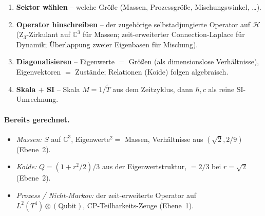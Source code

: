 \begin{keyresult}
\begin{enumerate}
  \item \textbf{Sektor wählen} -- welche Größe (Massen, Prozessgröße,
        Mischungswinkel, \dots).
  \item \textbf{Operator hinschreiben} -- der zugehörige selbstadjungierte
        Operator auf $\mathcal{H}$ (Z$_3$-Zirkulant auf $\mathbb{C}^3$ für
        Massen; zeit-erweiterter Connection-Laplace für Dynamik; Überlappung
        zweier Eigenbasen für Mischung).
  \item \textbf{Diagonalisieren} -- Eigenwerte $=$ Größen (als dimensionslose
        Verhältnisse), Eigenvektoren $=$ Zustände; Relationen (Koide) folgen
        algebraisch.
  \item \textbf{Skala $+$ SI} -- Skala $M=1/\tilde T$ aus dem Zeitzyklus, dann
        $\hbar,c$ als reine SI-Umrechnung.
\end{enumerate}
\end{keyresult}

\paragraph{Bereits gerechnet.}
\begin{itemize}
  \item \emph{Massen:} $S$ auf $\mathbb{C}^3$, Eigenwerte$^2=$ Massen,
        Verhältnisse aus $(\sqrt2,2/9)$ (Ebene~2).
  \item \emph{Koide:} $Q=(1+r^2/2)/3$ aus der Eigenwertstruktur, $=2/3$ bei
        $r=\sqrt2$ (Ebene~2).
  \item \emph{Prozess / Nicht-Markov:} der zeit-erweiterte Operator auf
        $L^2(T^4)\otimes(\text{Qubit})$, CP-Teilbarkeits-Zeuge (Ebene~1).
\end{itemize}

